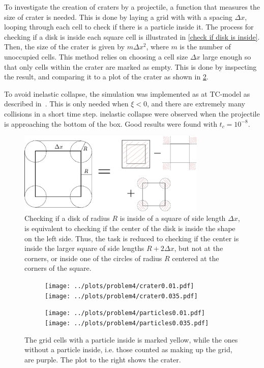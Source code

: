 \documentclass{article}
\begin{document}
    To investigate the creation of craters by a projectile, a function that measures the size of crater is needed. This is done by laying a grid with with a spacing $\Delta x$, looping through each cell to check if there is a particle inside it. The process for checking if a disk is inside each square cell is illustrated in \autoref{check if disk is inside}. Then, the size of the crater is given by $m \Delta x^2$, where $m$ is the number of unoccupied cells. This method relies on choosing a cell size $\Delta x$ large enough so that only cells within the crater are marked as empty. This is done by inspecting the result, and comparing it to a plot of the crater as shown in \ref{crater}.

    To avoid inelastic collapse, the simulation was implemented as at TC-model as described in~\cite{TC}. This is only needed when $\xi<0$, and there are extremely many collisions in a short time step. inelastic collapse were observed when the projectile is approaching the bottom of the box. Good results were found with $t_c = 10^{-8}$.

    \begin{figure}[H]
        \centering
        \includegraphics[width=0.8\textwidth]{figure.pdf}
        \caption{Checking if a disk of radius $R$ is inside of a square of side length $\Delta x$, is equivalent to checking if the center of the disk is inside the shape on the left side. Thus, the task is reduced to checking if the center is inside the larger square of side lengths $R + 2 \Delta x$, but not at the corners, or inside one of the circles of radius $R$ centered at the corners of the square.}
        \label{check if disk is inside}
    \end{figure}

    \begin{figure}[H]
        \centering
        \begin{subfigure}{.4\textwidth}                    
            \texttt{[image: ../plots/problem4/crater0.01.pdf]}
            \texttt{[image: ../plots/problem4/crater0.035.pdf]}
        \end{subfigure}
        \begin{subfigure}{.59\textwidth}                    
            \texttt{[image: ../plots/problem4/particles0.01.pdf]}
            \texttt{[image: ../plots/problem4/particles0.035.pdf]}
        \end{subfigure}
        \caption{The grid cells with a particle inside is marked yellow, while the ones without a particle inside, i.e. those counted as making up the grid, are purple. The plot to the right shows the crater.}
        \label{crater}
    \end{figure}
\end{document}
